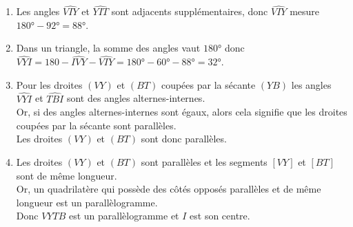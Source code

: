    \begin{enumerate}
   \item Les angles $\widehat{VIY}$ et $\widehat{YIT}$ sont adjacents supplémentaires, donc $\widehat{VIY}$ mesure $\ang{180}-\ang{92}=\ang{88}$.\\
   \item Dans un triangle, la somme des angles vaut $\ang{180}$ donc $\widehat{VYI}=180-\widehat{IVY}-\widehat{VIY}=\ang{180}-\ang{60}-\ang{88}=\ang{32}$.\\
   \item Pour les droites $(VY)$ et $(BT)$ coupées par la sécante $(YB)$ les angles $\widehat{VYI}$ et $\widehat{TBI}$ sont des angles alternes-internes.\\
   Or, si des angles alternes-internes sont égaux, alors cela signifie que les droites coupées par la sécante sont parallèles.\\
   Les droites $(VY)$ et $(BT)$ sont donc parallèles.\\
   \item Les droites $(VY)$ et $(BT)$ sont parallèles et les segments $[VY]$ et $[BT]$ sont de même longueur.\\
   Or, un quadrilatère qui possède des côtés opposés parallèles et de même longueur est un parallèlogramme.\\
   Donc $VYTB$ est un parallèlogramme et $I$ est son centre.
   \end{enumerate}
